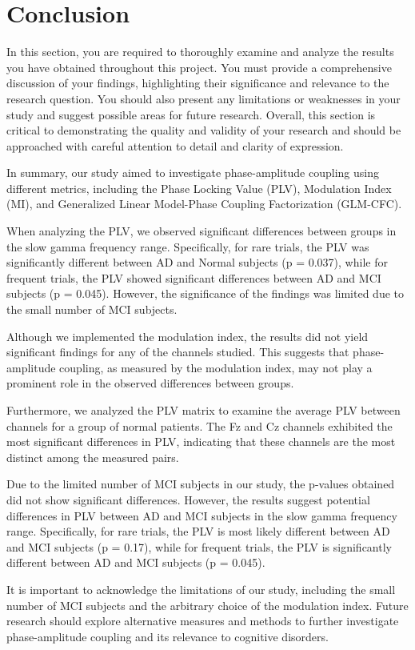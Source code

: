 \documentclass[12pt]{article}
\begin{document}
\section{Conclusion}
In this section, you are required to thoroughly examine and analyze the results you have obtained throughout this project. You must provide a comprehensive discussion of your findings, highlighting their significance and relevance to the research question. You should also present any limitations or weaknesses in your study and suggest possible areas for future research. Overall, this section is critical to demonstrating the quality and validity of your research and should be approached with careful attention to detail and clarity of expression.

    \vfil
	\begin{conclusion}

		In summary, our study aimed to investigate phase-amplitude coupling using different metrics, including the Phase Locking Value (PLV), Modulation Index (MI), and Generalized Linear Model-Phase Coupling Factorization (GLM-CFC).

		When analyzing the PLV, we observed significant differences between groups in the slow gamma frequency range. Specifically, for rare trials, the PLV was significantly different between AD and Normal subjects (p = 0.037), while for frequent trials, the PLV showed significant differences between AD and MCI subjects (p = 0.045). However, the significance of the findings was limited due to the small number of MCI subjects.

		Although we implemented the modulation index, the results did not yield significant findings for any of the channels studied. This suggests that phase-amplitude coupling, as measured by the modulation index, may not play a prominent role in the observed differences between groups.

		Furthermore, we analyzed the PLV matrix to examine the average PLV between channels for a group of normal patients. The Fz and Cz channels exhibited the most significant differences in PLV, indicating that these channels are the most distinct among the measured pairs.

		Due to the limited number of MCI subjects in our study, the p-values obtained did not show significant differences. However, the results suggest potential differences in PLV between AD and MCI subjects in the slow gamma frequency range. Specifically, for rare trials, the PLV is most likely different between AD and MCI subjects (p = 0.17), while for frequent trials, the PLV is significantly different between AD and MCI subjects (p = 0.045).

		It is important to acknowledge the limitations of our study, including the small number of MCI subjects and the arbitrary choice of the modulation index. Future research should explore alternative measures and methods to further investigate phase-amplitude coupling and its relevance to cognitive disorders.

	\end{conclusion}
\newpage


\end{document}
